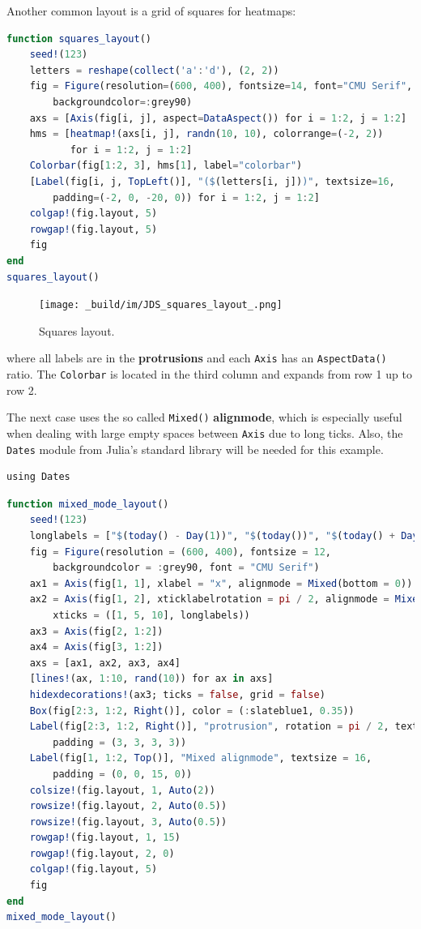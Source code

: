 \documentclass[
  notoc %
]{tufte-book}
\newcommand{\passthrough}[1]{#1}
\begin{document}
Another common layout is a grid of squares for heatmaps:

\begin{lstlisting}[language=Julia]
function squares_layout()
    seed!(123)
    letters = reshape(collect('a':'d'), (2, 2))
    fig = Figure(resolution=(600, 400), fontsize=14, font="CMU Serif",
        backgroundcolor=:grey90)
    axs = [Axis(fig[i, j], aspect=DataAspect()) for i = 1:2, j = 1:2]
    hms = [heatmap!(axs[i, j], randn(10, 10), colorrange=(-2, 2))
           for i = 1:2, j = 1:2]
    Colorbar(fig[1:2, 3], hms[1], label="colorbar")
    [Label(fig[i, j, TopLeft()], "($(letters[i, j]))", textsize=16,
        padding=(-2, 0, -20, 0)) for i = 1:2, j = 1:2]
    colgap!(fig.layout, 5)
    rowgap!(fig.layout, 5)
    fig
end
squares_layout()
\end{lstlisting}

\begin{figure}
\hypertarget{fig:squares_layout}{%
\centering
\texttt{[image: \_build/im/JDS\_squares\_layout\_.png]}
\caption{Squares layout.}\label{fig:squares_layout}
}
\end{figure}

where all labels are in the \textbf{protrusions} and each
\passthrough{\lstinline!Axis!} has an
\passthrough{\lstinline!AspectData()!} ratio. The
\passthrough{\lstinline!Colorbar!} is located in the third column and
expands from row 1 up to row 2.

The next case uses the so called \passthrough{\lstinline!Mixed()!}
\textbf{alignmode}, which is especially useful when dealing with large
empty spaces between \passthrough{\lstinline!Axis!} due to long ticks.
Also, the \passthrough{\lstinline!Dates!} module from Julia's standard
library will be needed for this example.

\begin{lstlisting}
using Dates
\end{lstlisting}

\begin{lstlisting}[language=Julia]
function mixed_mode_layout()
    seed!(123)
    longlabels = ["$(today() - Day(1))", "$(today())", "$(today() + Day(1))"]
    fig = Figure(resolution = (600, 400), fontsize = 12,
        backgroundcolor = :grey90, font = "CMU Serif")
    ax1 = Axis(fig[1, 1], xlabel = "x", alignmode = Mixed(bottom = 0))
    ax2 = Axis(fig[1, 2], xticklabelrotation = pi / 2, alignmode = Mixed(bottom = 0),
        xticks = ([1, 5, 10], longlabels))
    ax3 = Axis(fig[2, 1:2])
    ax4 = Axis(fig[3, 1:2])
    axs = [ax1, ax2, ax3, ax4]
    [lines!(ax, 1:10, rand(10)) for ax in axs]
    hidexdecorations!(ax3; ticks = false, grid = false)
    Box(fig[2:3, 1:2, Right()], color = (:slateblue1, 0.35))
    Label(fig[2:3, 1:2, Right()], "protrusion", rotation = pi / 2, textsize = 14,
        padding = (3, 3, 3, 3))
    Label(fig[1, 1:2, Top()], "Mixed alignmode", textsize = 16,
        padding = (0, 0, 15, 0))
    colsize!(fig.layout, 1, Auto(2))
    rowsize!(fig.layout, 2, Auto(0.5))
    rowsize!(fig.layout, 3, Auto(0.5))
    rowgap!(fig.layout, 1, 15)
    rowgap!(fig.layout, 2, 0)
    colgap!(fig.layout, 5)
    fig
end
mixed_mode_layout()
\end{lstlisting}
\end{document}

